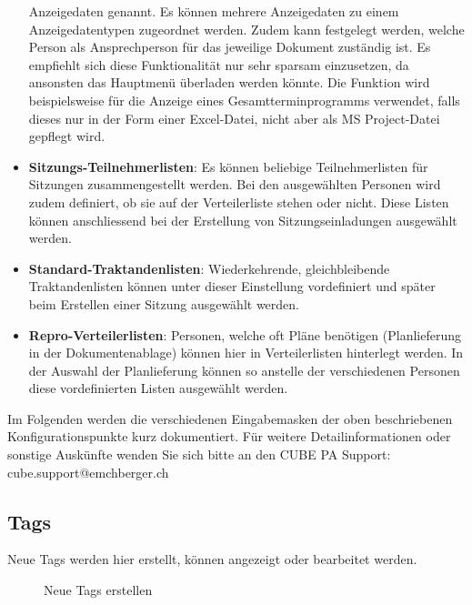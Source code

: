 \begin{itemize}
Anzeigedaten genannt. Es können mehrere Anzeigedaten zu einem Anzeigedatentypen zugeordnet werden. Zudem kann festgelegt werden, welche Person als Ansprechperson für das jeweilige Dokument zuständig ist. Es empfiehlt sich diese Funktionalität nur sehr sparsam einzusetzen, da ansonsten das Hauptmenü überladen werden könnte. Die Funktion wird beispielsweise für die Anzeige eines Gesamtterminprogramms verwendet, falls dieses nur in der Form einer Excel-Datei, nicht aber als MS Project-Datei gepflegt wird.
\item
\textbf{Sitzungs-Teilnehmerlisten}: Es können beliebige Teilnehmerlisten für Sitzungen zusammengestellt werden. Bei den ausgewählten Personen wird zudem definiert, ob sie auf der Verteilerliste stehen oder nicht. Diese Listen können anschliessend bei der Erstellung von Sitzungseinladungen ausgewählt werden.
\item
\textbf{Standard-Traktandenlisten}: Wiederkehrende, gleichbleibende Traktandenlisten können unter dieser Einstellung vordefiniert und später beim Erstellen einer Sitzung ausgewählt werden.
\item
\textbf{Repro-Verteilerlisten}: Personen, welche oft Pläne benötigen (Planlieferung in der Dokumentenablage) können hier in Verteilerlisten hinterlegt werden. In der Auswahl der Planlieferung können so anstelle der verschiedenen Personen diese vordefinierten Listen ausgewählt werden.
\end{itemize}

\vspace{\baselineskip}

Im Folgenden werden die verschiedenen Eingabemasken der oben beschriebenen Konfigurationspunkte kurz dokumentiert. Für weitere Detailinformationen oder sonstige Auskünfte wenden Sie sich bitte an den CUBE PA Support: {\color{red} cube.support@emchberger.ch}

\subsection{Tags}

Neue Tags werden hier erstellt, können angezeigt oder bearbeitet werden.

\begin{figure}[H]
\caption{Neue Tags erstellen}
\end{figure}

